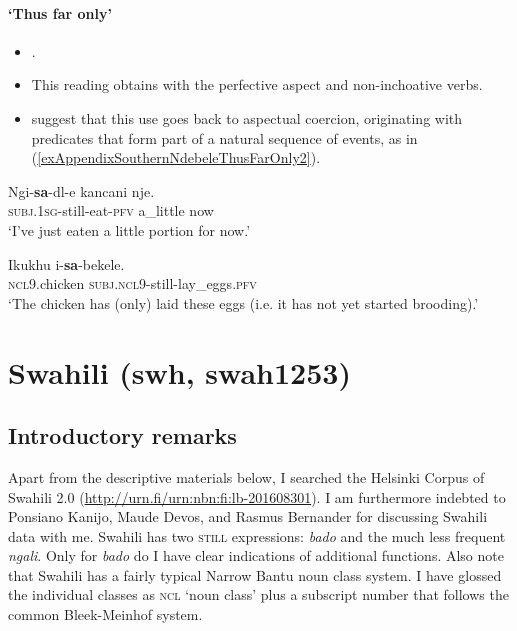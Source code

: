 \paragraph{\lq{}Thus far only\rq{}}
\label{appendixSouthernNdebeleRestrictive}
\begin{itemize}
	\item \textcite{CranePersohn2021}.
	\item This reading obtains with the perfective aspect and non-inchoative verbs.
		\item \textcite{CranePersohn2021} suggest that this use goes back to aspectual coercion, originating with predicates that form part of a natural sequence of events, as in (\ref{exAppendixSouthernNdebeleThusFarOnly2}).
\end{itemize}
\begin{exe}
	\ex
	\gll Ngi-\textbf{sa}-dl-e kancani nje.\\
	\textsc{subj}.1\textsc{sg}-still-eat-\textsc{pfv} a\_little now\\
	\glt \lq I've just eaten a little portion for now.' \parencite[243]{CranePersohn2021}
		
	\ex\label{exAppendixSouthernNdebeleThusFarOnly2}
	 \gll Ikukhu i-\textbf{sa}-bekele.\\
	 \textsc{ncl}9.chicken \textsc{subj}.\textsc{ncl}9-still-lay\_eggs.\textsc{pfv}\\
	 \glt \lq The chicken has (only) laid these eggs (i.e. it has not yet started brooding).' \parencite[275]{CranePersohn2021}
\end{exe}

\section{Swahili (swh, swah1253)}
\label{appendixSwahili}

\subsection{Introductory remarks}
Apart from the descriptive materials below, I searched the Helsinki Corpus of Swahili 2.0 (\url{http://urn.fi/urn:nbn:fi:lb-201608301}). I am furthermore indebted to Ponsiano Kanijo, Maude Devos, and Rasmus Bernander for discussing Swahili data with me. Swahili has two \textsc{still} expressions: \textit{bado} and the much less frequent \textit{ngali}. Only for \textit{bado} do I have clear indications of additional functions. Also note that Swahili has a fairly typical Narrow Bantu noun class system. I have glossed the individual classes as \textsc{ncl} \lq noun class' plus a subscript number that follows the common Bleek-Meinhof system.
